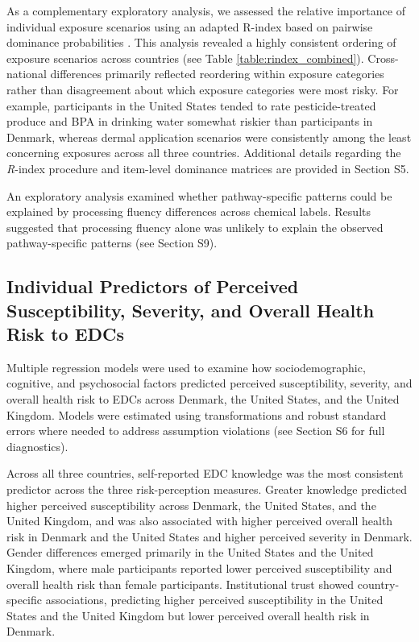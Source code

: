 

As a complementary exploratory analysis, we assessed the relative importance of individual exposure scenarios using an adapted R-index based on pairwise dominance probabilities \citep{o1992understanding, lagerkvist2013consumer}. This analysis revealed a highly consistent ordering of exposure scenarios across countries (see Table \ref{table:rindex_combined}). Cross-national differences primarily reflected reordering within exposure categories rather than disagreement about which exposure categories were most risky. For example, participants in the United States tended to rate pesticide-treated produce and BPA in drinking water somewhat riskier than participants in Denmark, whereas dermal application scenarios were consistently among the least concerning exposures across all three countries. Additional details regarding the \emph{R}-index procedure and item-level dominance matrices are provided in Section S5.

An exploratory analysis examined whether pathway-specific patterns could be explained by processing fluency differences across chemical labels. Results suggested that processing fluency alone was unlikely to explain the observed pathway-specific patterns (see Section S9).

\subsection{Individual Predictors of Perceived Susceptibility, Severity, and Overall Health Risk to EDCs}
Multiple regression models were used to examine how sociodemographic, cognitive, and psychosocial factors predicted perceived susceptibility, severity, and overall health risk to EDCs across Denmark, the United States, and the United Kingdom. Models were estimated using transformations and robust standard errors where needed to address assumption violations (see Section S6 for full diagnostics).

Across all three countries, self-reported EDC knowledge was the most consistent predictor across the three risk-perception measures. Greater knowledge predicted higher perceived susceptibility across Denmark, the United States, and the United Kingdom, and was also associated with higher perceived overall health risk in Denmark and the United States and higher perceived severity in Denmark. Gender differences emerged primarily in the United States and the United Kingdom, where male participants reported lower perceived susceptibility and overall health risk than female participants. Institutional trust showed country-specific associations, predicting higher perceived susceptibility in the United States and the United Kingdom but lower perceived overall health risk in Denmark.

